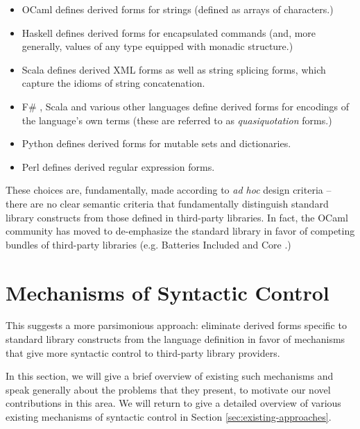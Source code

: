 \begin{itemize}
\item OCaml \cite{ocaml-manual} defines derived forms for strings (defined as arrays of characters.)
\item Haskell \cite{jones2003haskell} defines derived forms for encapsulated commands (and, more generally, values of any type equipped with monadic structure.)
\item Scala \cite{odersky2008programming} defines derived XML forms as well as string splicing forms, which capture the idioms of string concatenation.
\item F\# \cite{syme2012expert}, Scala \cite{shabalin2013quasiquotes} and various other languages define derived forms for encodings of the language's own terms (these are referred to as \emph{quasiquotation} forms.)
\item Python \cite{python} defines derived forms for mutable sets and dictionaries.
\item Perl \cite{perlre} defines derived regular expression forms.
\end{itemize}

These choices are, fundamentally, made according to \emph{ad hoc} design criteria -- there are no clear semantic criteria that fundamentally distinguish standard library constructs from  those defined in third-party libraries. 
In fact, the OCaml community has  moved to de-emphasize the standard library in favor of competing bundles of third-party libraries (e.g. Batteries Included \cite{OCaml-batteries} and Core \cite{OCaml-core}.)%

\section{Mechanisms of Syntactic Control}
This suggests a more parsimonious approach: eliminate derived forms  specific to standard library constructs from the language definition in favor of mechanisms that give more syntactic control to third-party library providers.

In this section, we will give a brief overview of existing such mechanisms and speak generally about the problems that they present, to motivate our novel contributions in this area. We will return to give a detailed overview of various existing mechanisms of syntactic control in Section \ref{sec:existing-approaches}. 

